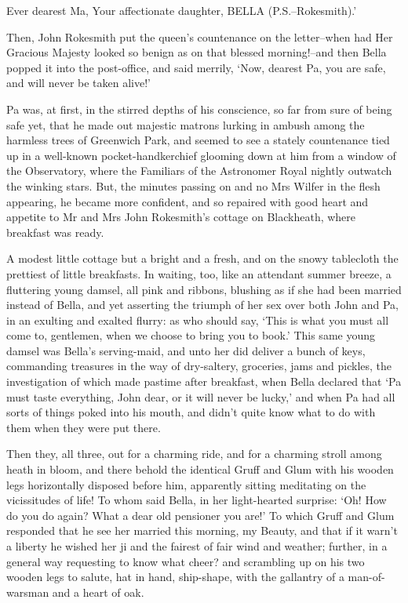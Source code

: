 Ever dearest Ma, Your affectionate daughter, BELLA (P.S.--Rokesmith).’


Then, John Rokesmith put the queen’s countenance on the letter--when had
Her Gracious Majesty looked so benign as on that blessed morning!--and
then Bella popped it into the post-office, and said merrily, ‘Now,
dearest Pa, you are safe, and will never be taken alive!’

Pa was, at first, in the stirred depths of his conscience, so far from
sure of being safe yet, that he made out majestic matrons lurking in
ambush among the harmless trees of Greenwich Park, and seemed to see a
stately countenance tied up in a well-known pocket-handkerchief glooming
down at him from a window of the Observatory, where the Familiars of the
Astronomer Royal nightly outwatch the winking stars. But, the minutes
passing on and no Mrs Wilfer in the flesh appearing, he became more
confident, and so repaired with good heart and appetite to Mr and Mrs
John Rokesmith’s cottage on Blackheath, where breakfast was ready.

A modest little cottage but a bright and a fresh, and on the snowy
tablecloth the prettiest of little breakfasts. In waiting, too, like
an attendant summer breeze, a fluttering young damsel, all pink and
ribbons, blushing as if she had been married instead of Bella, and yet
asserting the triumph of her sex over both John and Pa, in an exulting
and exalted flurry: as who should say, ‘This is what you must all come
to, gentlemen, when we choose to bring you to book.’ This same young
damsel was Bella’s serving-maid, and unto her did deliver a bunch of
keys, commanding treasures in the way of dry-saltery, groceries, jams
and pickles, the investigation of which made pastime after breakfast,
when Bella declared that ‘Pa must taste everything, John dear, or it
will never be lucky,’ and when Pa had all sorts of things poked into
his mouth, and didn’t quite know what to do with them when they were put
there.

Then they, all three, out for a charming ride, and for a charming stroll
among heath in bloom, and there behold the identical Gruff and Glum with
his wooden legs horizontally disposed before him, apparently sitting
meditating on the vicissitudes of life! To whom said Bella, in her
light-hearted surprise: ‘Oh! How do you do again? What a dear old
pensioner you are!’ To which Gruff and Glum responded that he see her
married this morning, my Beauty, and that if it warn’t a liberty he
wished her ji and the fairest of fair wind and weather; further, in a
general way requesting to know what cheer? and scrambling up on his two
wooden legs to salute, hat in hand, ship-shape, with the gallantry of a
man-of-warsman and a heart of oak.

